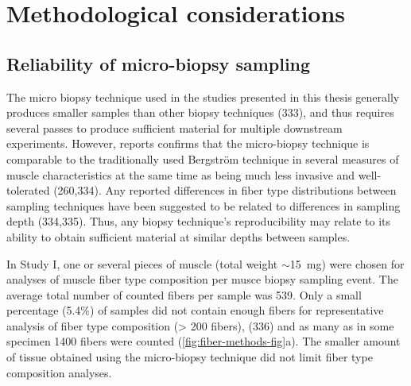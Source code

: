 \documentclass[twoside,10pt]{gihclass} %
\begin{document}
\hypertarget{methodological-considerations}{%
\chapter{Methodological considerations}\label{methodological-considerations}}

\hypertarget{reliability-of-micro-biopsy-sampling}{%
\section{Reliability of micro-biopsy sampling}\label{reliability-of-micro-biopsy-sampling}}

The micro biopsy technique used in the studies presented in this thesis generally produces smaller samples than other biopsy techniques (333), and thus
requires several passes to produce sufficient material for multiple
downstream experiments. However, reports confirms that the micro-biopsy
technique is comparable to the traditionally used Bergström technique in
several measures of muscle characteristics at the same time as being much less invasive and
well-tolerated (260,334).
Any reported differences in fiber type distributions between sampling techniques have been suggested to be related to differences in sampling depth (334,335).
Thus, any biopsy technique's reproducibility may relate to its ability to obtain sufficient material at similar depths between samples.

In Study I, one or several pieces of muscle (total weight
\(\sim\)\SI{15}{mg}) were chosen for analyses of muscle fiber type composition per musce biopsy sampling event. The average total number of counted fibers per sample was 539.
Only a small percentage (5.4\%) of samples did not contain enough fibers for representative analysis of fiber type composition (\textgreater{} 200 fibers),
(336)
and as many as in some specimen 1400 fibers were counted (\ref{fig:fiber-methods-fig}a).
The smaller amount of tissue obtained using the micro-biopsy technique did not limit fiber type composition analyses.
\end{document}
